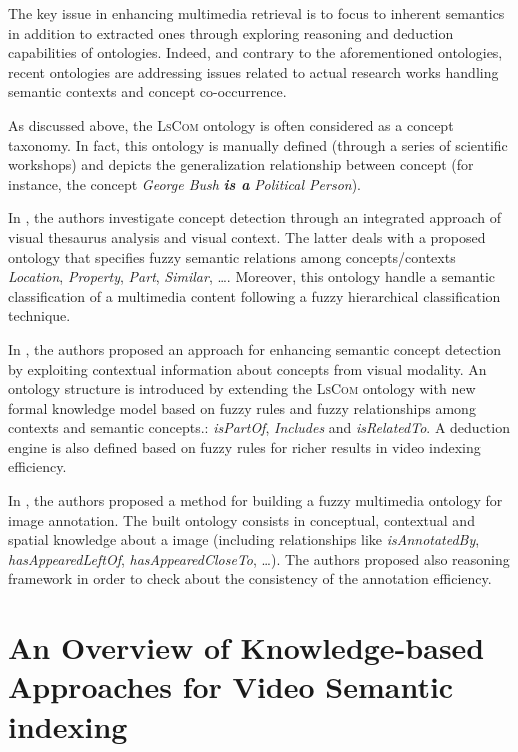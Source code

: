 		The key issue in enhancing multimedia retrieval is to focus to inherent semantics in addition to extracted 
		ones through exploring reasoning and deduction capabilities of ontologies. Indeed, and contrary to the 
		aforementioned ontologies, recent ontologies are addressing issues related to actual research works handling 
		semantic contexts and concept co-occurrence. 
		
		As discussed above, the \textsc{LsCom} ontology \citep{Naphade2006} is often considered as  a concept taxonomy. 
		In fact, this ontology is manually defined (through a series of scientific workshops)  and depicts the generalization 
		relationship between concept (for instance, the concept \emph{George Bush} \textbf{\textit{is a}} \emph{Political Person}).
		
		In \citep{Mylonas2008,Mylonas2009}, the authors investigate concept detection through an integrated approach 
		of visual thesaurus analysis and visual context. The latter deals with a proposed ontology that specifies 
		fuzzy semantic relations among concepts/contexts \emph{Location}, \emph{Property}, \emph{Part}, \emph{Similar}, 
		\dots{}. Moreover, this ontology handle a semantic classification of a multimedia content following a fuzzy 
		hierarchical classification technique.
		
		In \citep{Elleuch2011}, the authors proposed an approach for enhancing semantic
		concept detection by exploiting contextual information about concepts from visual modality. 
		An ontology structure is introduced by extending the \textsc{LsCom} ontology with new formal 
		knowledge model based on fuzzy rules and fuzzy relationships among contexts and semantic concepts.: 
		\emph{isPartOf}, \emph{Includes} and \emph{isRelatedTo}. A deduction engine is also defined based 
		on fuzzy rules for richer results in video indexing efficiency.
		
		In \cite{Bannour2013}, the authors proposed a method for building a fuzzy multimedia ontology for image annotation. 
		The built ontology consists in conceptual, contextual and spatial knowledge about a image (including relationships 
		like \emph{isAnnotatedBy}, \emph{hasAppearedLeftOf}, \emph{hasAppearedCloseTo}, \dots{}). The authors proposed 
		also reasoning framework in order to check about the consistency of the annotation efficiency.



	\label{issues}

\section{An Overview of Knowledge-based Approaches for Video Semantic indexing}
	\label{eval}
	
